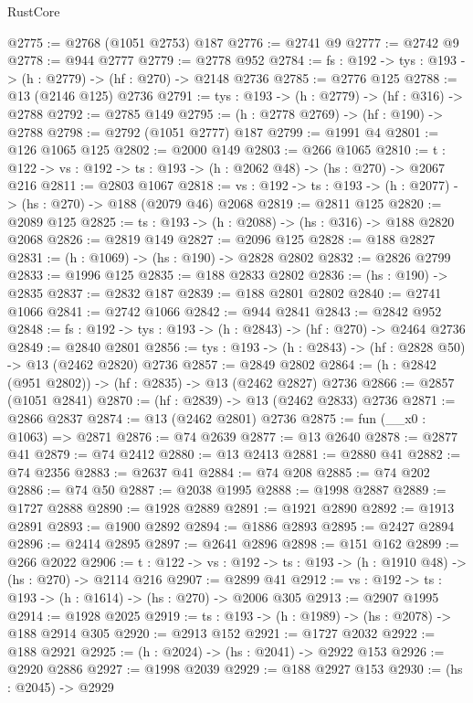 \begin{lexlean}{RustCore}
\begin{coremodule}
@2775 := @2768 (@1051 @2753) @187
@2776 := @2741 @9
@2777 := @2742 @9
@2778 := @944 @2777
@2779 := @2778 @952
@2784 := {fs : @192} -> {tys : @193} -> (h : @2779) -> (hf : @270) -> @2148 @2736
@2785 := @2776 @125
@2788 := @13 (@2146 @125) @2736
@2791 := {tys : @193} -> (h : @2779) -> (hf : @316) -> @2788
@2792 := @2785 @149
@2795 := (h : @2778 @2769) -> (hf : @190) -> @2788
@2798 := @2792 (@1051 @2777) @187
@2799 := @1991 @4
@2801 := @126 @1065 @125
@2802 := @2000 @149
@2803 := @266 @1065
@2810 := {t : @122} -> {vs : @192} -> {ts : @193} -> (h : @2062 @48) -> (hs : @270) -> @2067 @216
@2811 := @2803 @1067
@2818 := {vs : @192} -> {ts : @193} -> (h : @2077) -> (hs : @270) -> @188 (@2079 @46) @2068
@2819 := @2811 @125
@2820 := @2089 @125
@2825 := {ts : @193} -> (h : @2088) -> (hs : @316) -> @188 @2820 @2068
@2826 := @2819 @149
@2827 := @2096 @125
@2828 := @188 @2827
@2831 := (h : @1069) -> (hs : @190) -> @2828 @2802
@2832 := @2826 @2799
@2833 := @1996 @125
@2835 := @188 @2833 @2802
@2836 := (hs : @190) -> @2835
@2837 := @2832 @187
@2839 := @188 @2801 @2802
@2840 := @2741 @1066
@2841 := @2742 @1066
@2842 := @944 @2841
@2843 := @2842 @952
@2848 := {fs : @192} -> {tys : @193} -> (h : @2843) -> (hf : @270) -> @2464 @2736
@2849 := @2840 @2801
@2856 := {tys : @193} -> (h : @2843) -> (hf : @2828 @50) -> @13 (@2462 @2820) @2736
@2857 := @2849 @2802
@2864 := (h : @2842 (@951 @2802)) -> (hf : @2835) -> @13 (@2462 @2827) @2736
@2866 := @2857 (@1051 @2841)
@2870 := (hf : @2839) -> @13 (@2462 @2833) @2736
@2871 := @2866 @2837
@2874 := @13 (@2462 @2801) @2736
@2875 := fun (__x0 : @1063) => @2871
@2876 := @74 @2639
@2877 := @13 @2640
@2878 := @2877 @41
@2879 := @74 @2412
@2880 := @13 @2413
@2881 := @2880 @41
@2882 := @74 @2356
@2883 := @2637 @41
@2884 := @74 @208
@2885 := @74 @202
@2886 := @74 @50
@2887 := @2038 @1995
@2888 := @1998 @2887
@2889 := @1727 @2888
@2890 := @1928 @2889
@2891 := @1921 @2890
@2892 := @1913 @2891
@2893 := @1900 @2892
@2894 := @1886 @2893
@2895 := @2427 @2894
@2896 := @2414 @2895
@2897 := @2641 @2896
@2898 := @151 @162
@2899 := @266 @2022
@2906 := {t : @122} -> {vs : @192} -> {ts : @193} -> (h : @1910 @48) -> (hs : @270) -> @2114 @216
@2907 := @2899 @41
@2912 := {vs : @192} -> {ts : @193} -> (h : @1614) -> (hs : @270) -> @2006 @305
@2913 := @2907 @1995
@2914 := @1928 @2025
@2919 := {ts : @193} -> (h : @1989) -> (hs : @2078) -> @188 @2914 @305
@2920 := @2913 @152
@2921 := @1727 @2032
@2922 := @188 @2921
@2925 := (h : @2024) -> (hs : @2041) -> @2922 @153
@2926 := @2920 @2886
@2927 := @1998 @2039
@2929 := @188 @2927 @153
@2930 := (hs : @2045) -> @2929

\end{coremodule}
\end{lexlean}

